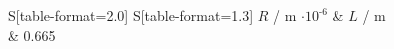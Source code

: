 \begin{table}[!htp]
\centering
\caption{Eigenschaften des Drahtes.}
\label{tab:draht}
\begin{tabular}{S[table-format=2.0] S[table-format=1.3]}
\toprule
{$R$ / m $\cdot 10^\text{-6}$} & {$L$ / m} \\
 & 0.665 \\
\bottomrule
\end{tabular}
\end{table}